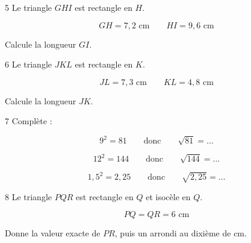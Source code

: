 \documentclass[9.5pt,a4paper,landscape]{article}
\begin{document}
\vspace{0.16cm}


\noindent
\begin{minipage}[t]{0.242\linewidth}
\begin{exo}{5}
Le triangle \(GHI\) est rectangle en \(H\).

\[
GH=7{,}2\text{ cm}
\qquad
HI=9{,}6\text{ cm}
\]

Calcule la longueur \(GI\).
\end{exo}
\end{minipage}
\hfill
%
\begin{minipage}[t]{0.242\linewidth}
\begin{exo}{6}
Le triangle \(JKL\) est rectangle en \(K\).

\[
JL=7{,}3\text{ cm}
\qquad
KL=4{,}8\text{ cm}
\]

Calcule la longueur \(JK\).
\end{exo}
\end{minipage}
\hfill
%
\begin{minipage}[t]{0.242\linewidth}
\begin{exo}{7}
Complète :

\[
9^2=81
\qquad\text{donc}\qquad
\sqrt{81}=\ldots
\]

\[
12^2=144
\qquad\text{donc}\qquad
\sqrt{144}=\ldots
\]

\[
1{,}5^2=2{,}25
\qquad\text{donc}\qquad
\sqrt{2{,}25}=\ldots
\]
\end{exo}
\end{minipage}
\hfill
%
\begin{minipage}[t]{0.242\linewidth}
\begin{exo}{8}
Le triangle \(PQR\) est rectangle en \(Q\) et isocèle en \(Q\).

\[
PQ=QR=6\text{ cm}
\]

Donne la valeur exacte de \(PR\), puis un arrondi au dixième de cm.
\end{exo}
\end{minipage}

\vspace{0.16cm}

\end{document}
